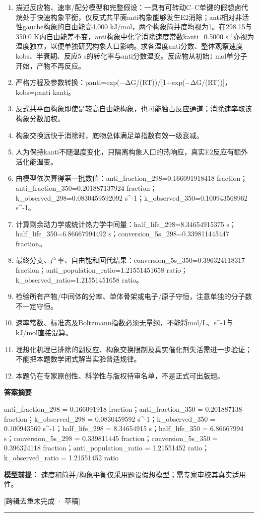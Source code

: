 \documentclass[UTF8,11pt,a4paper]{ctexart}
\begin{document}
\begin{enumerate}
\item 描述反应物、速率/配分模型和完整假设：一具有可转动C–C单键的假想卤代烷处于快速构象平衡，仅反式共平面anti构象能够发生E2消除；anti相对非活性gauche构象的自由能高4.000 kJ/mol，两个构象简并度均视为1。在298.15与350.0 K内自由能差不变，anti构象中化学消除速度常数kanti=0.5000 s⁻¹亦视为温度独立，以便单独研究构象人口影响。求各温度anti分数、整体观察速度kobs、半衰期、反应5 s的转化率与anti分数温变。反应物从初始1 mol单分子开始，产物不再反应。
\item 严格方程及参数转换：panti=exp(−ΔG/(RT))/[1+exp(−ΔG/(RT))]，kobs=panti kanti。
\item 反式共平面构象即使是较高自由能构象，也可能独占反应通道；消除速率取该构象分数加权。
\item 构象交换远快于消除时，底物总体满足单指数有效一级衰减。
\item 人为保持kanti不随温度变化，只隔离构象人口的热响应，真实E2反应有额外活化能温变。
\item 由模型依次算得第一批数值：anti\_fraction\_298=0.166091918418 fraction；anti\_fraction\_350=0.201887137924 fraction；k\_observed\_298=0.0830459592092 s\textasciicircum{}-1；k\_observed\_350=0.100943568962 s\textasciicircum{}-1。
\item 计算剩余动力学或统计热力学中间量：half\_life\_298=8.34654915375 s；half\_life\_350=6.86667994492 s；conversion\_5s\_298=0.339811445447 fraction。
\item 最终分支、产率、自由能和回代结果：conversion\_5s\_350=0.396324118317 fraction；anti\_population\_ratio=1.21551451658 ratio；k\_observed\_ratio=1.21551451658 ratio。
\item 检验所有产物/中间体的分率、单体骨架或电子/原子守恒，注意单独的分子数不一定守恒。
\item 速率常数、标准态及Boltzmann指数必须无量纲，不能将mol/L、s\textasciicircum{}-1与kJ/mol直接混算。
\item 理想化机理已排除的副反应、构象交换限制及真实催化剂失活需进一步验证；不能把本题数学闭式解当实验普适规律。
\item 本题仍在专家原创性、科学性与版权待审名单，不是正式可出版题。
\end{enumerate}
\noindent\textbf{答案摘要}\par
anti\_fraction\_298 = 0.166091918 fraction；anti\_fraction\_350 = 0.201887138 fraction；k\_observed\_298 = 0.0830459592 s\textasciicircum{}-1；k\_observed\_350 = 0.100943569 s\textasciicircum{}-1；half\_life\_298 = 8.34654915 s；half\_life\_350 = 6.86667994 s；conversion\_5s\_298 = 0.339811445 fraction；conversion\_5s\_350 = 0.396324118 fraction；anti\_population\_ratio = 1.21551452 ratio；k\_observed\_ratio = 1.21551452 ratio\par
\noindent\textbf{模型前提：}
速度和简并/构象平衡仅采用题设假想模型；需专家审校其真实适用性。\par
\noindent\textcolor{red!65!black}{[跨辑去重未完成 · 草稿]} \par
\medskip\hrule\medskip
{}
\end{document}
